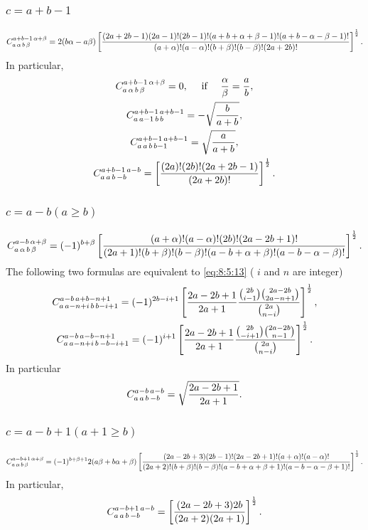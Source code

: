 \subsubsection{$c=a+b-1$}
\begin{equation}
C_{a\,\alpha\,b\,\beta}^{a+b-1\,\alpha+\beta}=2(b \alpha-a \beta)\left[\frac{(2 a+2 b-1)(2 a-1)!(2 b-1)!(a+b+\alpha+\beta-1)!(a+b-\alpha-\beta-1)!}{(a+\alpha)!(a-\alpha)!(b+\beta)!(b-\beta)!(2 a+2 b)!}\right]^{\frac{1}{2}} . \label{eq:8:5:8}
\end{equation}
In particular,
\begin{gather}
C_{a\,\alpha\,b\,\beta}^{a+b-1\,\alpha+\beta}=0, \quad \text { if } \quad \frac{\alpha}{\beta}=\frac{a}{b}, \label{eq:8:5:9}\\
C_{a\,a-1\,b\,b}^{a+b-1\,a+b-1}=-\sqrt{\frac{b}{a+b}}, \label{eq:8:5:10}\\
C_{a\,a\,b\,b-1}^{a+b-1\,a+b-1}=\sqrt{\frac{a}{a+b}}, \label{eq:8:5:11}\\
C_{a\,a\,b\,-b}^{a+b-1\,a-b}=\left[\frac{(2 a)!(2 b)!(2 a+2 b-1)}{(2 a+2 b)!}\right]^{\frac{1}{2}}. \label{eq:8:5:12}
\end{gather}
\subsubsection{$c=a-b(a \geq b)$}
\begin{equation}
C_{a\,\alpha\,b\,\beta}^{a-b\,\alpha+\beta}=(-1)^{b+\beta}\left[\frac{(a+\alpha)!(a-\alpha)!(2 b)!(2 a-2 b+1)!}{(2 a+1)!(b+\beta)!(b-\beta)!(a-b+\alpha+\beta)!(a-b-\alpha-\beta)!}\right]^{\frac{1}{2}}. \label{eq:8:5:13}
\end{equation}
The following two formulas are equivalent to \eqref{eq:8:5:13} ( $i$ and $n$ are integer)
\begin{gather}
C_{a\,a-n+i\,b\,b-i+1}^{a-b\,a+b-n+1}=(-1)^{2 b-i+1}\left[\frac{2 a-2 b+1}{2 a+1} \frac{\binom{2 b}{i-1}\binom{2 a-2 b}{2 a-n+1}}{\binom{2 a}{n-i}}\right]^{\frac{1}{2}}, \label{eq:8:5:14}\\
C_{a\,a-n+i\,b\,-b-i+1}^{a-b\,a-b-n+1}=(-1)^{i+1}\left[\frac{2 a-2 b+1}{2 a+1} \frac{\binom{2 b}{-i+1}\binom{2 a-2 b}{n-1}}{\binom{2 a}{n-i}}\right]^{\frac{1}{2}}. \label{eq:8:5:15}
\end{gather}
In particular
\begin{equation}
C_{a\,a\,b\,-b}^{a-b\,a-b}=\sqrt{\frac{2 a-2 b+1}{2 a+1}} . \label{eq:8:5:16}
\end{equation}
\subsubsection{$c=a-b+1(a+1 \geq b)$}
\begin{equation}
C_{a\,\alpha\,b\,\beta}^{a-b+1\,\alpha+\beta}=(-1)^{b+\beta+1} 2(a \beta+b \alpha+\beta)\left[\frac{(2 a-2 b+3)(2 b-1)!(2 a-2 b+1)!(a+\alpha)!(a-\alpha)!}{(2 a+2)!(b+\beta)!(b-\beta)!(a-b+\alpha+\beta+1)!(a-b-\alpha-\beta+1)!}\right]^{\frac{1}{2}} . \label{eq:8:5:17}
\end{equation}
In particular,
\begin{equation}
C_{a\,a\,b\,-b}^{a-b+1\,a-b}=\left[\frac{(2 a-2 b+3) 2 b}{(2 a+2)(2 a+1)}\right]^{\frac{1}{2}}. \label{eq:8:5:18}
\end{equation}
